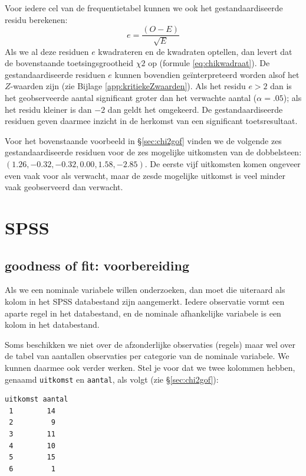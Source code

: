 \documentclass[
]{book}
\begin{document}
Voor iedere cel van de frequentietabel kunnen we ook het gestandaardiseerde residu berekenen:
\begin{equation}
  \label{eq:chi2-residu}
    e = \frac{(O-E)}{\sqrt{E}}
\end{equation}
Als we al deze residuen \(e\) kwadrateren en de kwadraten optellen, dan levert dat de bovenstaande toetsingsgrootheid \(\chi2\) op (formule \eqref{eq:chikwadraat}). De gestandaardiseerde residuen \(e\) kunnen bovendien geïnterpreteerd worden alsof het \(Z\)-waarden zijn (zie Bijlage \ref{app:kritiekeZwaarden}). Als het residu \(e>2\) dan is het geobserveerde aantal significant groter dan het verwachte aantal (\(\alpha=.05\)); als het residu kleiner is dan \(-2\) dan geldt het omgekeerd. De gestandaardiseerde residuen geven daarmee inzicht in de herkomst van een significant toetsresultaat.

Voor het bovenstaande voorbeeld in §\ref{sec:chi2gof} vinden we de volgende zes gestandaardiseerde residuen voor de zes mogelijke uitkomsten van de dobbelsteen: \((1.26, -0.32, -0.32, 0.00, 1.58, -2.85)\). De eerste vijf uitkomsten komen ongeveer even vaak voor als verwacht, maar de zesde mogelijke uitkomst is veel minder vaak geobserveerd dan verwacht.

\hypertarget{spss-14}{%
\section{SPSS}\label{spss-14}}

\hypertarget{goodness-of-fit-voorbereiding}{%
\subsection{goodness of fit: voorbereiding}\label{goodness-of-fit-voorbereiding}}

Als we een nominale variabele willen onderzoeken, dan moet die uiteraard
als kolom in het SPSS databestand zijn aangemerkt. Iedere observatie
vormt een aparte regel in het databestand, en de nominale afhankelijke
variabele is een kolom in het databestand.

Soms beschikken we niet over de afzonderlijke observaties (regels) maar
wel over de tabel van aantallen observaties per categorie van de
nominale variabele. We kunnen daarmee ook verder werken. Stel je voor
dat we twee kolommen hebben, genaamd \texttt{uitkomst} en \texttt{aantal}, als volgt
(zie §\ref{sec:chi2gof}):

\begin{verbatim}
uitkomst aantal
 1        14
 2         9
 3        11
 4        10
 5        15
 6         1
\end{verbatim}
\end{document}
